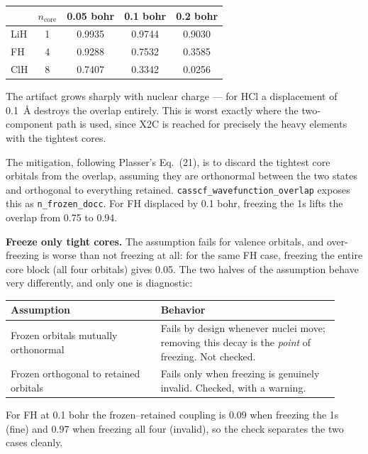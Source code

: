 \documentclass[aip,jcp,preprint]{revtex4-1}
\begin{document}
\begin{center}
\begin{tabular}{@{}lcccc@{}}
\toprule
& $n_\mathrm{core}$ & 0.05 bohr & 0.1 bohr & 0.2 bohr \\
\midrule
LiH & 1 & 0.9935 & 0.9744 & 0.9030 \\
FH  & 4 & 0.9288 & 0.7532 & 0.3585 \\
ClH & 8 & 0.7407 & 0.3342 & 0.0256 \\
\bottomrule
\end{tabular}
\end{center}

The artifact grows sharply with nuclear charge --- for HCl a displacement of
0.1~\AA{} destroys the overlap entirely. This is worst exactly where the
two-component path is used, since X2C is reached for precisely the heavy
elements with the tightest cores.

The mitigation, following Plasser's Eq.~(21), is to discard the tightest core
orbitals from the overlap, assuming they are orthonormal between the two
states and orthogonal to everything retained. \texttt{casscf\_wavefunction\_overlap}
exposes this as \texttt{n\_frozen\_docc}. For FH displaced by 0.1 bohr,
freezing the 1s lifts the overlap from 0.75 to 0.94.

\textbf{Freeze only tight cores.} The assumption fails for valence orbitals,
and over-freezing is worse than not freezing at all: for the same FH case,
freezing the entire core block (all four orbitals) gives 0.05. The two halves
of the assumption behave very differently, and only one is diagnostic:

\begin{center}
\begin{tabular}{@{}p{0.42\linewidth}p{0.50\linewidth}@{}}
\toprule
Assumption & Behavior \\
\midrule
Frozen orbitals mutually orthonormal & Fails by design whenever nuclei move;
removing this decay is the \emph{point} of freezing. Not checked. \\
Frozen orthogonal to retained orbitals & Fails only when freezing is genuinely
invalid. Checked, with a warning. \\
\bottomrule
\end{tabular}
\end{center}

For FH at 0.1 bohr the frozen--retained coupling is $0.09$ when freezing the 1s
(fine) and $0.97$ when freezing all four (invalid), so the check separates the
two cases cleanly.
\end{document}

